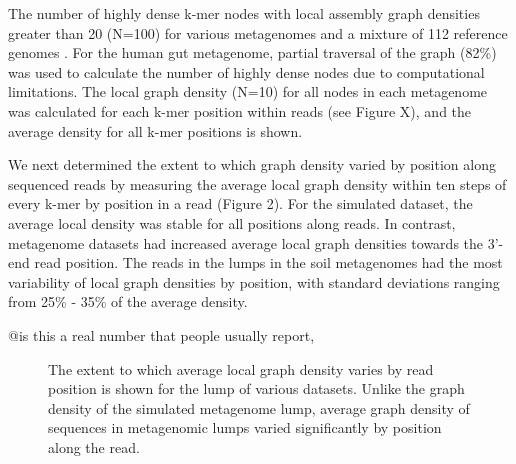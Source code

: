 \documentclass[11pt]{article} %
\begin{document}
\begin{table}
\caption{The number of highly dense k-mer nodes with local assembly graph densities greater than 20 (N=100) for various metagenomes and a mixture of 112 reference genomes \cite{Pignatelli:2011p742}. For the human gut metagenome, partial traversal of the graph (82\%) was used to calculate the number of highly dense nodes due to computational limitations.  The local graph density (N=10) for all nodes in each metagenome was calculated for each k-mer position within reads (see Figure X), and the average density for all k-mer positions is shown.}  
\end{table}

We next determined the extent to which graph density varied by position along sequenced reads by measuring the average local graph density within ten steps of every k-mer by position in a read (Figure 2).  For the simulated dataset, the average local density was stable for all positions along reads.  In contrast, metagenome datasets had increased average local graph densities towards the 3'-end read position.  The reads in the lumps in the soil metagenomes had the most variability of local graph densities by position, with standard deviations ranging from 25\% - 35\% of the average density.

@is this a real number that people usually report, %

\begin{figure}
\caption{The extent to which average local graph density varies by read position is shown for the lump of various datasets.  Unlike the graph density of the simulated metagenome lump, average graph density of sequences in metagenomic lumps varied significantly by position along the read.}
\end{figure}
\end{document}
